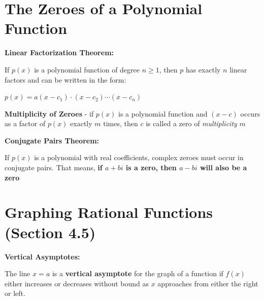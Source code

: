\documentclass[12pt]{article}
\newenvironment{myindentpar}[1]%
     {\begin{list}{}%
             {\setlength{\leftmargin}{#1}}%
             \item[]%
     }
     {\end{list}}
\begin{document}
\section{The Zeroes of a Polynomial Function}

\textbf{Linear Factorization Theorem:}

\begin{myindentpar}{1cm}

If $p(x)$ is a polynomial function of degree $n \geq 1$, then $p$ has exactly $n$ linear factors and can be written in the form:
\newline

\centerline{$p(x) = a(x-c_{1}) \cdot (x - c_{2}) \cdots (x - c_{n})$}

\end{myindentpar}

\vspace{.5cm}

\textbf{Multiplicity of Zeroes} - if $p(x)$ is a polynomial function and $(x-c)$ occurs as a factor of $p(x)$ exactly $m$ times, then $c$ is called a zero of \textit{multiplicity} $m$

\newpage

\textbf{Conjugate Pairs Theorem:}

\begin{myindentpar}{1cm}

If $p(x)$ is a polynomial with real coefficients, complex zeroes must occur in conjugate pairs. That means, \textbf{if $a+bi$ is a zero, then $a-bi$ will also be a zero}
\end{myindentpar}

\section{Graphing Rational Functions (Section 4.5)}

\textbf{Vertical Asymptotes:} 

The line $x = a$ is a \textbf{vertical asymptote} for the graph of a function if $f(x)$ either increases or decreases without bound as $x$ approaches from either the right or left.  
\end{document}
